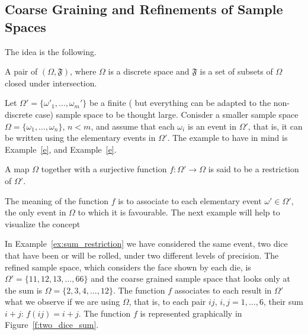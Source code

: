 \subsection{ Coarse Graining and Refinements of Sample Spaces}
	The idea is the following. 
	\begin{definition}
		A pair of $(\Omega, \mathfrak F)$, where $\Omega$ is a discrete space and $\mathfrak F$ is a set of subsets of $\Omega$ closed under intersection.  
	\end{definition}
	Let $\Omega' = \{\omega'_1, \ldots, \omega_m'\}$ be a finite ( but everything can be adapted to the non-discrete case) sample space to be thought large. Conisder a smaller sample space $\Omega =\{\omega_1 , \ldots, \omega_n\}$, $n < m$, and assume that each $\omega_i$ is an event in $\Omega'$, that is, it can be written using the elementary events in $\Omega'$. The example to have in mind is Example~\ref{e}, and Example~\ref{e}.    
	\begin{definition}
		\label{d:restriction}
		A map $\Omega$ together with a surjective function $f: \Omega' \to \Omega$ is said to be a restriction of $\Omega'$. 
	\end{definition}

	The meaning of the function $f$ is to associate to each elementary event $\omega' \in \Omega'$, the only event in $\Omega$ to which it is favourable. The next example will help to visualize the concept
	\begin{example}
		\label{ex:two_dice_sample}
		In Example~\ref{ex:sum_restriction} we have considered the same event, two dice that have been or will be rolled, under two different levels of precision. The refined sample space, which considers the face shown by each die, is $\Omega' = \{11,12,13,...,66\}$ and the coarse grained sample space that looks only at the sum is $\Omega = \{2,3,4,\ldots, 12\}$. The function $f$ associates to each result in $\Omega'$ what we observe if we are using $\Omega$, that is, to each pair $ij$, $i,j  = 1,\ldots, 6$, their sum $i + j$: $f(ij ) = i + j $. The function $f$ is represented graphically in Figure~\ref{f:two_dice_sum}.  
	\end{example}

